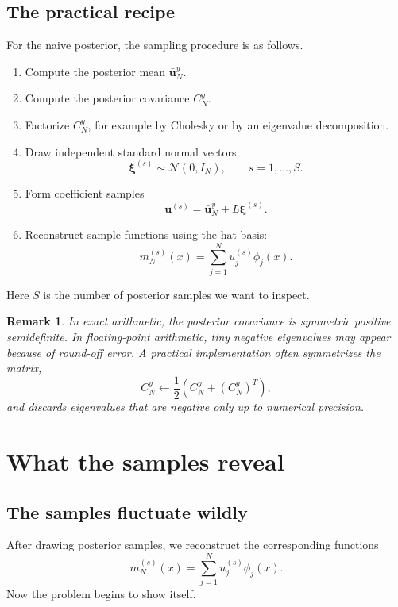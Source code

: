 \documentclass[11pt,a4paper]{book}
\newtheorem{remark}[definition]{Remark}
\begin{document}
\subsection{The practical recipe}

For the naive posterior, the sampling procedure is as follows.

\begin{enumerate}[label=\arabic*.]
    \item Compute the posterior mean $\bar{\bm{u}}_N^y$.
    \item Compute the posterior covariance $C_N^y$.
    \item Factorize $C_N^y$, for example by Cholesky or by an eigenvalue
    decomposition.
    \item Draw independent standard normal vectors
    \[
        \bm{\xi}^{(s)} \sim \mathcal{N}(0,I_N),
        \qquad
        s=1,\ldots,S.
    \]
    \item Form coefficient samples
    \[
        \bm{u}^{(s)}
        =
        \bar{\bm{u}}_N^y
        +
        L\bm{\xi}^{(s)}.
    \]
    \item Reconstruct sample functions using the hat basis:
    \[
        m_N^{(s)}(x)
        =
        \sum_{j=1}^N u_j^{(s)}\phi_j(x).
    \]
\end{enumerate}

Here $S$ is the number of posterior samples we want to inspect.

\begin{remark}
In exact arithmetic, the posterior covariance is symmetric positive
semidefinite. In floating-point arithmetic, tiny negative eigenvalues may appear
because of round-off error. A practical implementation often symmetrizes the
matrix,
\[
    C_N^y \leftarrow \frac{1}{2}(C_N^y + (C_N^y)^T),
\]
and discards eigenvalues that are negative only up to numerical precision.
\end{remark}

\section{What the samples reveal}

\subsection{The samples fluctuate wildly}

After drawing posterior samples, we reconstruct the corresponding functions
\[
    m_N^{(s)}(x)
    =
    \sum_{j=1}^N u_j^{(s)}\phi_j(x).
\]
Now the problem begins to show itself.
\end{document}
